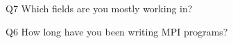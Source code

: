 \begin{description}%
\item{Q7} Which fields are you mostly working in?%
\item{Q6} How long have you been writing MPI programs?%
\end{description}%
